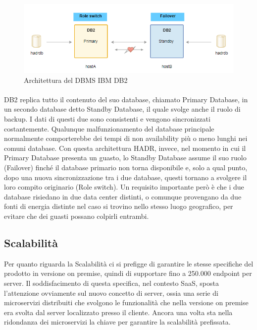 \begin{figure}[h!]
	\centering
	\includegraphics[width=\textwidth,keepaspectratio=true]{capitoli/imgs/db2.PNG}
	\caption{Architettura del DBMS IBM DB2}
\end{figure}

\paragraph{}
DB2 replica tutto il contenuto del suo database, chiamato Primary Database, in un secondo database detto Standby Database, il quale svolge anche il ruolo di backup. I dati di questi due sono consistenti e vengono sincronizzati costantemente. Qualunque malfunzionamento del database principale normalmente comporterebbe dei tempi di non availability più o meno lunghi nei comuni database. Con questa architettura HADR, invece, nel momento in cui il Primary Database presenta un guasto, lo Standby Database assume il suo ruolo (Failover) finché il database primario non torna disponibile e, solo a qual punto, dopo una nuova sincronizzazione tra i due database, questi tornano a svolgere il loro compito originario (Role switch). Un requisito importante però è che i due database risiedano in due data center distinti, o comunque provengano da due fonti di energia distinte nel caso si trovino nello stesso luogo geografico, per evitare che dei guasti possano colpirli entrambi. 

\subsection{Scalabilità}
Per quanto riguarda la Scalabilità ci si prefigge di garantire le stesse specifiche del prodotto in versione on premise, quindi di supportare fino a 250.000 endpoint per server. Il soddisfacimento di questa specifica, nel contesto SaaS, sposta l'attenzione ovviamente sul nuovo concetto di server, ossia una serie di microservizi distribuiti che svolgono le funzionalità che nella versione on premise era svolta dal server localizzato presso il cliente. Ancora una volta sta nella ridondanza dei microservizi la chiave per garantire la scalabilità prefissata.

